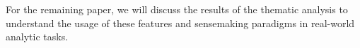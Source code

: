 For the remaining paper, we will discuss the results of the thematic analysis to understand the usage of these features and sensemaking paradigms in real-world analytic tasks.
